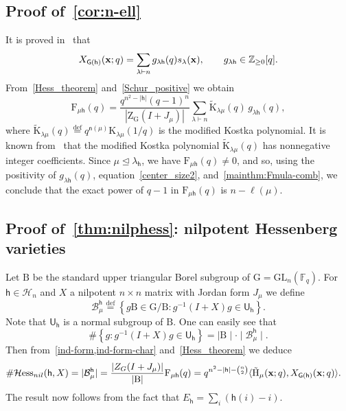 \documentclass[12pt,a4paper,reqno]{amsart}
\theoremstyle{plain}
\theoremstyle{definition}
\newcommand{\defin}{\overset{\mathrm{def}}{=}}
\newcommand{\less}{\unlhd}
\newcommand{\ZZ}{{\mathbb{Z}}}
\newcommand{\FF}{{\mathbb{F}}}
\newcommand{\1}{\mathds{1}}
\newcommand{\G}{{\mathrm{G}}}
\newcommand{\GL}{\mathrm{GL}}
\newcommand{\F}{\mathrm{F}}
\newcommand{\HH}{\mathrm{H}}
\newcommand{\cen}{\mathrm{Z}_\G}
\newcommand{\K}{{\mathrm{K}}}
\newcommand{\B}{\mathrm{B}}
\newcommand{\x}{{\bf x}}
\newcommand{\U}{\mathsf{U}}
\newcommand{\fn}{\mathsf{n}}
\newcommand{\hes}{\mathsf{h}}
\newcommand{\graph}{\mathsf{G}}
\newcommand{\EE}{\mathsf{E}}
\begin{document}
\subsection{Proof of~\cref{cor:n-ell}}

It is proved in~\cite[Theorem 6.3]{Shareshian-Wachs} that 
\begin{equation}\label{Schur_positive}
    X_{\graph(\hes)}(\x; q) = \sum_{\lambda \vdash n} g_{\lambda \hes}(q) s_\lambda(\x),\qquad g_{\lambda\hes}\in\ZZ_{\geq 0}[q].
\end{equation}
From~\cref{Hess_theorem} and~\cref{Schur_positive} we obtain
 $$
 \F_{\mu\hes}(q)=\frac{q^{n^2-|\hes|} (q-1)^n}{|\cen(I+J_\mu)|}\sum_{\lambda \vdash n}\tilde{\K}_{\lambda\mu}(q)\, g_{\lambda \hes}(q),
 $$   
 where $\tilde{\K}_{\lambda\mu}(q)\defin q^{\fn(\mu)}\K_{\lambda\mu}(1/q)$ is the modified Kostka polynomial. It is known from~\cite[p.~242, Eq.~(6.5)]{Macdonald} that the modified Kostka polynomial $\tilde{\K}_{\lambda\mu}(q)$ has nonnegative integer coefficients. Since $\mu \less \lambda_\hes$, we have $\F_{\mu\hes}(q) \neq 0$, and so, using the positivity of $g_{\lambda\hes}(q)$, equation~\cref{center_size2}, and~\cref{mainthm:Fmula-comb}, we conclude that the exact power of $q - 1$ in $\F_{\mu\hes}(q)$ is $n - \ell(\mu)$.


\subsection{Proof of~\cref{thm:nilphess}: nilpotent Hessenberg varieties}
 Let $\B$ be the standard upper triangular Borel subgroup of $\G = \GL_n(\FF_q)$. For $\hes\in \mathcal{H}_n$ and $X$ a nilpotent $n\times n$ matrix  with Jordan form $J_\mu$ we define 
$$
\mathcal{B}_\mu^\hes\defin \left\{g\B \in \G/\B: g^{-1}(I+X)g\in \U_\hes\right\}.
$$
Note that $\U_\hes$ is a normal subgroup of $\B$. One can easily see that
$$
\#\left\{g: g^{-1}(I+X)g\in \U_\hes\right\}=\mid \B\mid\cdot\mid\mathcal{B}_{\mu}^\hes\mid .
$$
Then from~\cref{ind-form,ind-form-char} 
and~\cref{Hess_theorem}
we deduce 
\begin{align*}
  \#\text{$\mathcal{H}$ess$_{nil}$}(\hes,X)&=|\mathcal{B}_{\mu}^\hes|=\frac{|Z_G(I+J_\mu)|}{|\B|}\F_{\mu\hes}(q)
  =q^{n^2-|\hes|-\binom{n}{2}}\langle \tilde{\HH}_\mu(\x;q),X_{\graph(\hes)}(\x;q)\rangle.
\end{align*}
 The result now follows from the fact that $E_\hes=\sum_i(\hes(i)-i).$
\end{document}
